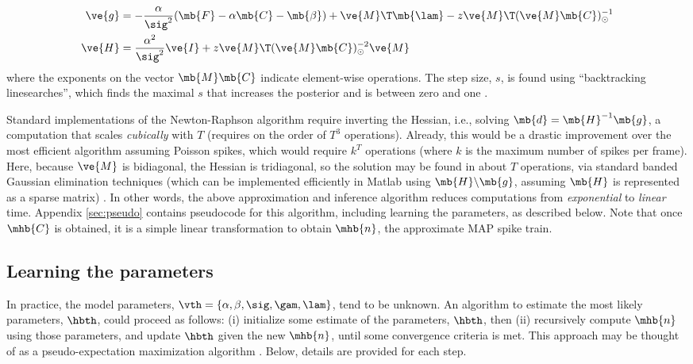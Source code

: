 \begin{subequations} \label{eq:NR}
\begin{align}
\ve{g} &= -\frac{\alpha}{\sig^2}(\mb{F} -\alpha \mb{C} - \mb{\beta}) + \ve{M}\T\mb{\lam} - \zzz \ve{M}\T (\ve{M} \mb{C})^{-1}_\odot \label{eq:g} \\
\ve{H} &= \frac{\alpha^2}{\sig^2} \ve{I} + \zzz \ve{M}\T (\ve{M} \mb{C})^{-2}_\odot \ve{M} \label{eq:H}
\end{align}
\end{subequations}
\noindent where the exponents on the vector $\mb{M} \mb{C}$ indicate element-wise operations. The step size, $s$, is found using ``backtracking linesearches'', which finds the maximal $s$ that increases the posterior and is between zero and one \cite{Press92}.

Standard implementations of the Newton-Raphson algorithm require inverting the Hessian, i.e.,  solving $\mb{d} = \mb{H}^{-1} \mb{g}$, a computation that scales \emph{cubically} with $T$ (requires on the order of $T^3$ operations). Already, this would be a drastic improvement over the most efficient algorithm assuming Poisson spikes, which would require $k^T$ operations (where $k$ is the maximum number of spikes per frame).  Here, because $\ve{M}$ is bidiagonal, the Hessian is tridiagonal, so the solution may be found in about $T$ operations, via standard banded Gaussian elimination techniques (which can be implemented efficiently in Matlab using $\mb{H} \backslash \mb{g}$, assuming $\mb{H}$ is represented as a sparse matrix) \cite{PaninskiWu09}. In other words, the above approximation and inference algorithm reduces computations from \emph{exponential} to \emph{linear} time.  Appendix \ref{sec:pseudo} contains pseudocode for this algorithm, including learning the parameters, as described below. Note that once $\mhb{C}$ is obtained, it is a simple linear transformation to obtain $\mhb{n}$, the approximate MAP spike train.





\subsection{Learning the parameters} \label{sec:learn}

In practice, the model parameters, $\vth=\{\alpha, \beta, \sig, \gam, \lam\}$, tend to be unknown.  An algorithm to estimate the most likely parameters, $\hbth$, could proceed as follows: (i) initialize some estimate of the parameters, $\hbth$, then (ii) recursively compute $\mhb{n}$ using those parameters, and update $\hbth$ given the new $\mhb{n}$, until some convergence criteria is met.  This approach may be thought of as a pseudo-expectation maximization algorithm \cite{DempsterRubin77, VogelsteinPaninski09}. Below, details are provided for each step.

